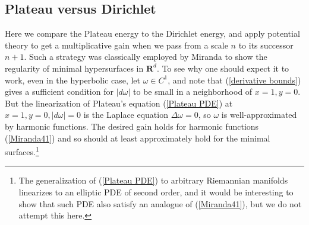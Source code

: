 \documentclass[reqno,12pt,letterpaper]{amsart}
\newcommand{\RR}{\mathbf{R}}
\theoremstyle{definition}
\numberwithin{equation}{section}
\begin{document}
\subsection{Plateau versus Dirichlet}

Here we compare the Plateau energy to the Dirichlet energy, and apply potential theory to get a multiplicative gain when we pass from a scale $n$ to its successor $n + 1$.
Such a strategy was classically employed by Miranda \cite[Teorema 4.3]{Miranda66} to show the regularity of minimal hypersurfaces in $\RR^d$.
To see why one should expect it to work, even in the hyperbolic case, let $\omega \in C^1$, and note that (\ref{derivative bounds}) gives a sufficient condition for $|d\omega|$ to be small in a neighborhood of $x = 1, y = 0$.
But the linearization of Plateau's equation (\ref{Plateau PDE}) at $x = 1, y = 0, |d\omega| = 0$ is the Laplace equation $\Delta \omega = 0$, so $\omega$ is well-approximated by harmonic functions.
The desired gain holds for harmonic functions (\ref{Miranda41}) and so should at least approximately hold for the minimal surfaces.\footnote{The generalization of (\ref{Plateau PDE}) to arbitrary Riemannian manifolds linearizes to an elliptic PDE of second order, and it would be interesting to show that such PDE also satisfy an analogue of (\ref{Miranda41}), but we do not attempt this here.}
\end{document}
